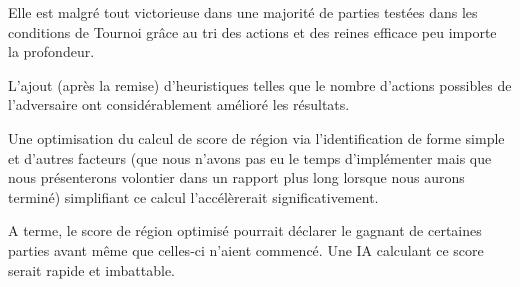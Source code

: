 \documentclass[utf8]{article}
\begin{document}
Elle est malgré tout victorieuse dans une majorité de parties testées dans les conditions de Tournoi grâce au tri des actions et des reines efficace peu importe la profondeur.

L'ajout (après la remise) d'heuristiques telles que le nombre d'actions possibles de l'adversaire ont considérablement amélioré les résultats.

Une optimisation du calcul de score de région via l'identification de forme simple et d'autres facteurs (que nous n'avons pas eu le temps d'implémenter mais que nous présenterons volontier dans un rapport plus long lorsque nous aurons terminé) simplifiant ce calcul l'accélèrerait significativement.

A terme, le score de région optimisé pourrait déclarer le gagnant de certaines parties avant même que celles-ci n'aient commencé.
Une IA calculant ce score serait rapide et imbattable.
\end{document}
